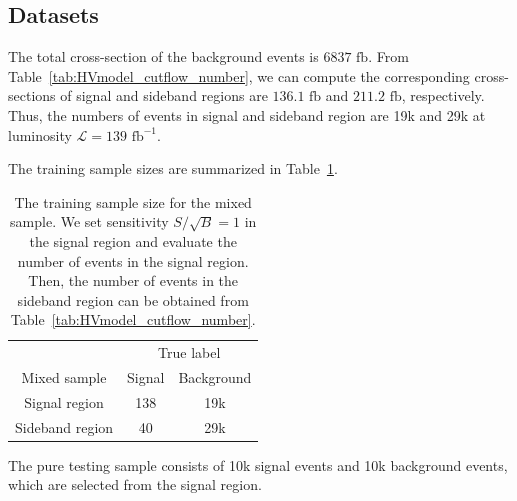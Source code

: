\documentclass[12pt]{article}
\begin{document}
	\subsection{Datasets}%
	\label{sub:datasets}
		The total cross-section of the background events is $6837 \text{ fb}$. From Table~\ref{tab:HVmodel_cutflow_number}, we can compute the corresponding cross-sections of signal and sideband regions are $136.1 \text{ fb}$ and $211.2 \text{ fb}$, respectively. Thus, the numbers of events in signal and sideband region are 19k and 29k at luminosity $\mathcal{L} = 139 \text{ fb}^{-1}$.

		The training sample sizes are summarized in Table~\ref{tab:training_sample_size_cwola_hunting_hv}.
		\begin{table}[htpb]
			\centering
			\caption{The training sample size for the mixed sample. We set sensitivity $S / \sqrt{B} = 1$ in the signal region and evaluate the number of events in the signal region. Then, the number of events in the sideband region can be obtained from Table~\ref{tab:HVmodel_cutflow_number}.}
			\label{tab:training_sample_size_cwola_hunting_hv}
			\begin{tabular}{c|cc}
								& \multicolumn{2}{c}{True label} \\
				Mixed sample    & Signal       & Background      \\ \hline
				Signal region   & 138          & 19k             \\
				Sideband region & 40           & 29k
			\end{tabular}
		\end{table}	

		The pure testing sample consists of 10k signal events and 10k background events, which are selected from the signal region.
\end{document}
